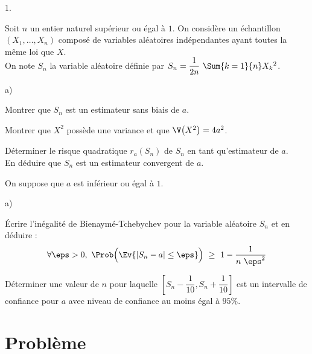 

\begin{noliste}{1.}
  \setcounter{enumi}{5} %
  \setlength{\itemsep}{4mm}
\item Soit $n$ un entier naturel supérieur ou égal à $1$. On considère
  un échantillon $(X_1, \ldots, X_n)$ composé de variables aléatoires
  indépendantes ayant toutes la même loi que $X$.\\
  On note $S_n$ la variable aléatoire définie par $S_n = \dfrac{1}{2n}
  \ \Sum{k=1}{n} X_k{}^2$.

  \begin{noliste}{a)}
    \setlength{\itemsep}{2mm}
  \item Montrer que $S_n$ est un estimateur sans biais de $a$.

    

  \item Montrer que $X^2$ possède une variance et que $\V\big(X^2\big)
    = 4a^2$.

    

  \item Déterminer le risque quadratique $r_a(S_n)$ de $S_n$ en tant
    qu'estimateur de $a$.\\
    En déduire que $S_n$ est un estimateur convergent de $a$.

    
  \end{noliste}

\item On suppose que $a$ est inférieur ou égal à $1$.
  \begin{noliste}{a)}
    \setlength{\itemsep}{2mm}
  \item Écrire l'inégalité de Bienaymé-Tchebychev pour la variable
    aléatoire $S_n$ et en déduire :
    \[
    \forall \eps > 0, \ \Prob\Big(\Ev{|S_n - a| \leq \eps} \Big) \
    \geq \ 1 - \dfrac{1}{n \ \eps^2}
    \]
    
    
    



  \item Déterminer une valeur de $n$ pour laquelle $\left[ S_n -
      \dfrac{1}{10}, S_n + \dfrac{1}{10}\right]$ est un intervalle de
    confiance pour $a$ avec niveau de confiance au moins égal à
    $95\%$.

    
  \end{noliste}
\end{noliste}




\section*{Problème}

